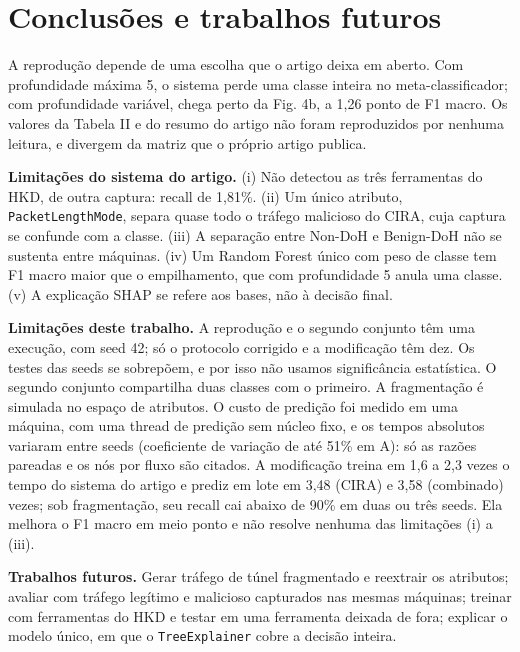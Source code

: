 \documentclass[conference]{IEEEtran}
\begin{document}
\section{Conclusões e trabalhos futuros}

A reprodução depende de uma escolha que o artigo deixa em aberto. Com profundidade máxima 5, o sistema perde uma classe inteira no meta-classificador; com profundidade variável, chega perto da Fig. 4b, a 1,26 ponto de F1 macro. Os valores da Tabela II e do resumo do artigo não foram reproduzidos por nenhuma leitura, e divergem da matriz que o próprio artigo publica.

\textbf{Limitações do sistema do artigo.} (i) Não detectou as três ferramentas do HKD, de outra captura: recall de 1,81\%. (ii) Um único atributo, \texttt{PacketLengthMode}, separa quase todo o tráfego malicioso do CIRA, cuja captura se confunde com a classe. (iii) A separação entre Non-DoH e Benign-DoH não se sustenta entre máquinas. (iv) Um Random Forest único com peso de classe tem F1 macro maior que o empilhamento, que com profundidade 5 anula uma classe. (v) A explicação SHAP se refere aos bases, não à decisão final.

\textbf{Limitações deste trabalho.} A reprodução e o segundo conjunto têm uma execução, com seed 42; só o protocolo corrigido e a modificação têm dez. Os testes das seeds se sobrepõem, e por isso não usamos significância estatística. O segundo conjunto compartilha duas classes com o primeiro. A fragmentação é simulada no espaço de atributos. O custo de predição foi medido em uma máquina, com uma thread de predição sem núcleo fixo, e os tempos absolutos variaram entre seeds (coeficiente de variação de até 51\% em A): só as razões pareadas e os nós por fluxo são citados. A modificação treina em 1,6 a 2,3 vezes o tempo do sistema do artigo e prediz em lote em 3,48 (CIRA) e 3,58 (combinado) vezes; sob fragmentação, seu recall cai abaixo de 90\% em duas ou três seeds. Ela melhora o F1 macro em meio ponto e não resolve nenhuma das limitações (i) a (iii).

\textbf{Trabalhos futuros.} Gerar tráfego de túnel fragmentado e reextrair os atributos; avaliar com tráfego legítimo e malicioso capturados nas mesmas máquinas; treinar com ferramentas do HKD e testar em uma ferramenta deixada de fora; explicar o modelo único, em que o \texttt{TreeExplainer} cobre a decisão inteira.
\end{document}
